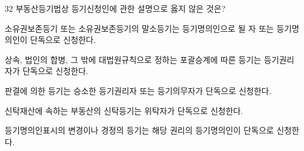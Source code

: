 \begin{question}{32}
부동산등기법상 등기신청인에 관한 설명으로 옳지 않은 것은?
\begin{choices}
  \item 소유권보존등기 또는 소유권보존등기의 말소등기는 등기명의인으로 될 자 또는 등기명의인이 단독으로 신청한다.
  \item 상속, 법인의 합병, 그 밖에 대법원규칙으로 정하는 포괄승계에 따른 등기는 등기권리자가 단독으로 신청한다.
  \item 판결에 의한 등기는 승소한 등기권리자 또는 등기의무자가 단독으로 신청한다.
  \item 신탁재산에 속하는 부동산의 신탁등기는 위탁자가 단독으로 신청한다.
  \item 등기명의인표시의 변경이나 경정의 등기는 해당 권리의 등기명의인이 단독으로 신청한다.
\end{choices}
\end{question}
